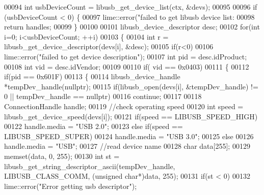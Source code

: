 \begin{DoxyCode}
{{00094     \textcolor{keywordtype}{int} usbDeviceCount = libusb\_get\_device\_list(ctx, &devs);
00095 
00096     \textcolor{keywordflow}{if} (usbDeviceCount < 0) \{
00097         lime::error(\textcolor{stringliteral}{"failed to get libusb device list: %
00098         \textcolor{keywordflow}{return} handles;
00099     \}
00100 
00101     libusb\_device\_descriptor desc;
00102     \textcolor{keywordflow}{for}(\textcolor{keywordtype}{int} i=0; i<usbDeviceCount; ++i)
00103     \{
00104         \textcolor{keywordtype}{int} r = libusb\_get\_device\_descriptor(devs[i], &desc);
00105         \textcolor{keywordflow}{if}(r<0)
00106             lime::error(\textcolor{stringliteral}{"failed to get device description"});
00107         \textcolor{keywordtype}{int} pid = desc.idProduct;
00108         \textcolor{keywordtype}{int} vid = desc.idVendor;
00109 
00110         \textcolor{keywordflow}{if}( vid == 0x0403)
00111         \{
00112             \textcolor{keywordflow}{if}(pid == 0x601F)
00113             \{
00114                 libusb\_device\_handle *tempDev\_handle(\textcolor{keyword}{nullptr});
00115                 \textcolor{keywordflow}{if}(libusb\_open(devs[i], &tempDev\_handle) != 0 || tempDev\_handle == \textcolor{keyword}{nullptr})
00116                     \textcolor{keywordflow}{continue};
00117 
00118                 ConnectionHandle handle;
00119                 \textcolor{comment}{//check operating speed}
00120                 \textcolor{keywordtype}{int} speed = libusb\_get\_device\_speed(devs[i]);
00121                 \textcolor{keywordflow}{if}(speed == LIBUSB\_SPEED\_HIGH)
00122                     handle.media = \textcolor{stringliteral}{"USB 2.0"};
00123                 \textcolor{keywordflow}{else} \textcolor{keywordflow}{if}(speed == LIBUSB\_SPEED\_SUPER)
00124                     handle.media = \textcolor{stringliteral}{"USB 3.0"};
00125                 \textcolor{keywordflow}{else}
00126                     handle.media = \textcolor{stringliteral}{"USB"};
00127                 \textcolor{comment}{//read device name}
00128                 \textcolor{keywordtype}{char} data[255];
00129                 memset(data, 0, 255);
00130                 \textcolor{keywordtype}{int} st = libusb\_get\_string\_descriptor\_ascii(tempDev\_handle, LIBUSB\_CLASS\_COMM, (\textcolor{keywordtype}{unsigned} \textcolor{keywordtype}{
      char}*)data, 255);
00131                 \textcolor{keywordflow}{if}(st < 0)
00132                     lime::error(\textcolor{stringliteral}{"Error getting usb descriptor"});
}}}
\end{DoxyCode}
